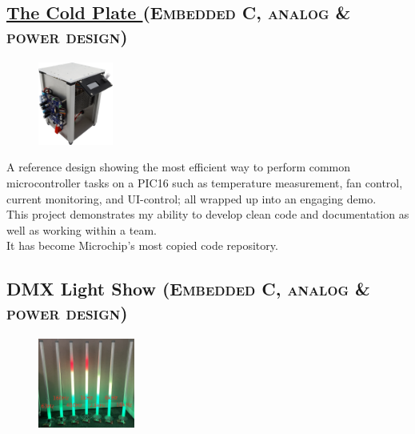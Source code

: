 \documentclass[
	10pt, %
]{FreemanCV}
\begin{document}
\begin{paracol}{2} %

\vspace*{-10pt}
\leavevmode \subsection{\href{https://github.com/microchip-pic-avr-examples/pic16f17146-cold-plate-mplab-mcc}{The Cold Plate \linkcolor\scriptsize\faLink}
\hfill
\textsc{\footnotesize{(Embedded C, analog \& power design)}}}

\setlength\intextsep{0pt} %
\begin{figure} %
	\hspace*{-5pt} %
    \includegraphics[width=70pt]{cold_plate} %
\end{figure}

A reference design showing the most efficient way to perform common microcontroller tasks on a PIC16
such as temperature measurement, fan control, current monitoring, and UI-control;
all wrapped up into an engaging demo.\\

This project demonstrates my ability to develop clean code and documentation as well as working within a team.\\
It has become Microchip's most copied code repository.


\vspace*{-10pt} %
\leavevmode\subsection{DMX Light Show
\hfill
\textsc{\footnotesize{(Embedded C, analog \& power design)}}}

\setlength\intextsep{-5pt} %
\begin{figure} %
	\hspace*{-5pt} %
    \includegraphics[width=90pt]{dmx} %
\end{figure}


\end{paracol}
\end{document}
